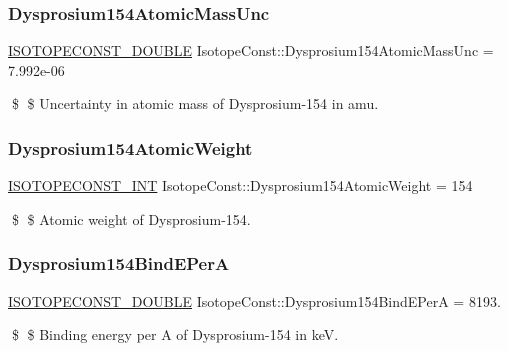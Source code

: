 \subsubsection{\texorpdfstring{Dysprosium154\+Atomic\+Mass\+Unc}{Dysprosium154AtomicMassUnc}}
{\footnotesize\ttfamily \mbox{\hyperlink{group___isotope_const-_macros_ga8f45a7272ce02c0b4c65c44636ed719a}{I\+S\+O\+T\+O\+P\+E\+C\+O\+N\+S\+T\+\_\+\+D\+O\+U\+B\+LE}} Isotope\+Const\+::\+Dysprosium154\+Atomic\+Mass\+Unc = 7.\+992e-\/06}

\$ \$ Uncertainty in atomic mass of Dysprosium-\/154 in amu. \mbox{\label{group___isotope_const-_dysprosium-_dy154_gab132237b90e4384d2280742eb65dddd6}} 
\subsubsection{\texorpdfstring{Dysprosium154\+Atomic\+Weight}{Dysprosium154AtomicWeight}}
{\footnotesize\ttfamily \mbox{\hyperlink{group___isotope_const-_macros_ga5f18360b3e99483a35c32d789e62621c}{I\+S\+O\+T\+O\+P\+E\+C\+O\+N\+S\+T\+\_\+\+I\+NT}} Isotope\+Const\+::\+Dysprosium154\+Atomic\+Weight = 154}

\$ \$ Atomic weight of Dysprosium-\/154. \mbox{\label{group___isotope_const-_dysprosium-_dy154_ga5b463f6c2d6e927a70416c20b578b8e6}} 
\subsubsection{\texorpdfstring{Dysprosium154\+Bind\+E\+PerA}{Dysprosium154BindEPerA}}
{\footnotesize\ttfamily \mbox{\hyperlink{group___isotope_const-_macros_ga8f45a7272ce02c0b4c65c44636ed719a}{I\+S\+O\+T\+O\+P\+E\+C\+O\+N\+S\+T\+\_\+\+D\+O\+U\+B\+LE}} Isotope\+Const\+::\+Dysprosium154\+Bind\+E\+PerA = 8193.}

\$ \$ Binding energy per A of Dysprosium-\/154 in keV. \mbox{\label{group___isotope_const-_dysprosium-_dy154_gaaf73d619f51b29d109a9c8753cbb5f03}} 
